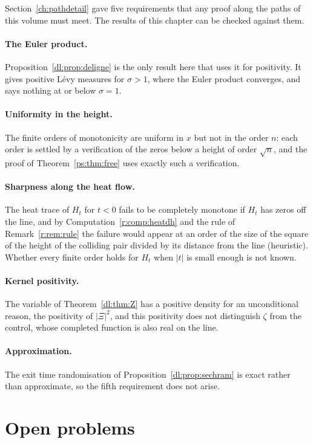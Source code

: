 Section~\ref{ch:pathdetail} gave five requirements that any proof along the paths of this volume must meet. The results of this chapter can be checked against them.

\paragraph{The Euler product.} Proposition~\ref{dl:prop:deligne} is the only result here that uses it for positivity. It gives positive L\'evy measures for $\sigma>1$, where the Euler product converges, and says nothing at or below $\sigma=1$.
\paragraph{Uniformity in the height.} The finite orders of monotonicity are uniform in $x$ but not in the order $n$: each order is settled by a verification of the zeros below a height of order $\sqrt n$, and the proof of Theorem~\ref{ps:thm:free} uses exactly such a verification.

\paragraph{Sharpness along the heat flow.} The heat trace of $H_t$ for $t<0$ fails to be completely monotone if $H_t$ has zeros off the line, and by Computation~\ref{r:comp:heatdh} and the rule of Remark~\ref{r:rem:rule} the failure would appear at an order of the size of the square of the height of the colliding pair divided by its distance from the line (heuristic). Whether every finite order holds for $H_t$ when $|t|$ is small enough is not known.


\paragraph{Kernel positivity.} The variable of Theorem~\ref{dl:thm:Z} has a positive density for an unconditional reason, the positivity of $|\Xi|^2$, and this positivity does not distinguish $\zeta$ from the control, whose completed function is also real on the line.

\paragraph{Approximation.} The exit time randomisation of Proposition~\ref{dl:prop:sechram} is exact rather than approximate, so the fifth requirement does not arise.


\section{Open problems}

